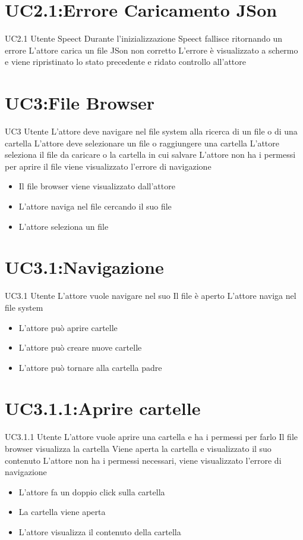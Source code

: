 \documentclass[../AnalisideiRequisiti.tex]{subfiles}
\begin{document}
	\section{UC2.1:Errore Caricamento JSon}
	\UserCase
	{UC2.1}
	{Utente}
	{Speect}
	{Durante l'inizializzazione Speect fallisce ritornando un errore }
	{L'attore carica un file JSon non corretto}
	{L'errore è visualizzato a schermo e viene ripristinato lo stato precedente e ridato controllo all'attore}
	{}
	{}

	
	\section{UC3:File Browser}
	\UserCase
	{UC3}
	{Utente}
	{}
	{L'attore deve navigare nel file system alla ricerca di un file o di una cartella}
	{L'attore deve selezionare un file o raggiungere una cartella}
	{L'attore seleziona il file da caricare o la cartella in cui salvare}
	{L'attore non ha i permessi per aprire il file viene visualizzato l'errore di navigazione }
	{
		\begin{itemize}
			\item{} Il file browser viene visualizzato dall'attore
			\item{} L'attore naviga nel file  cercando il suo file 
			\item{} L'attore seleziona un file 
		\end{itemize}
	}
	\section{UC3.1:Navigazione}
	\UserCase
	{UC3.1}
	{Utente}
	{}
	{L'attore vuole navigare nel suo }
	{Il file  è aperto}
	{L'attore naviga nel file system}
	{}
	{
		\begin{itemize}
			\item{} L'attore può aprire cartelle 
			\item{} L'attore può creare nuove cartelle 
			\item{} L'attore può tornare alla cartella padre 
		\end{itemize}
	}	
	\section{UC3.1.1:Aprire cartelle}
	\UserCase
	{UC3.1.1}
	{Utente}
	{}
	{L'attore vuole aprire una cartella e ha i permessi per farlo}
	{Il file browser visualizza la cartella}
	{Viene aperta la cartella e visualizzato il suo contenuto}
	{L'attore non ha i permessi necessari, viene visualizzato l'errore di navigazione }
	{
		\begin{itemize}
			\item{} L'attore fa un doppio click sulla cartella
			\item{} La cartella viene aperta
			\item{} L'attore visualizza il contenuto della cartella
		\end{itemize}
	}
\end{document}
